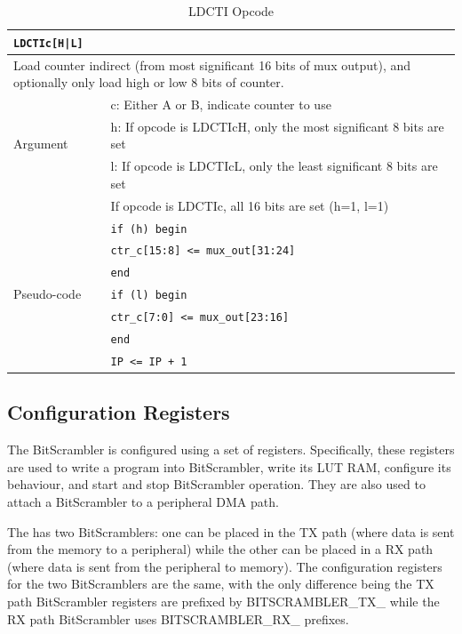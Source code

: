 \documentclass[main\_\_EN.tex]{subfiles}
\begin{document}
\begin{table}[H]
\caption{LDCTI Opcode}
\label{tab:bitscrm-ldcti-opcode}
\begin{tabular}{|l|l|}
\hline
\multicolumn{2}{|l|}{\texttt{LDCTIc[H|L]}} \\
\hline
\multicolumn{2}{|L{17cm}|}{Load counter indirect (from most significant 16 bits of mux output), and optionally only load high or low 8 bits of counter.} \\
\hline
\multirow{3}{*}{Argument} & c: Either A or B, indicate counter to use \\
& h: If opcode is LDCTIcH, only the most significant 8 bits are set\\
& l: If opcode is LDCTIcL, only the least significant 8 bits are set \\
& If opcode is LDCTIc, all 16 bits are set (h=1, l=1) \\
\hline
\multirow{7}{*}{Pseudo-code} & \texttt{if (h) begin} \\
& \hspace*{4mm} \texttt{ctr\_c[15:8] <= mux\_out[31:24]} \\
& \texttt{end} \\
& \texttt{if (l) begin} \\
& \hspace*{4mm} \texttt{ctr\_c[7:0] <= mux\_out[23:16]} \\
& \texttt{end} \\
& \texttt{IP <= IP + 1} \\
\hline
\end{tabular}
\end{table}


\subsection{Configuration Registers}

The BitScrambler is configured using a set of registers. Specifically, these registers are used to write a program into BitScrambler, write its LUT RAM, configure its behaviour, and start and stop BitScrambler operation. They are also used to attach a BitScrambler to a peripheral DMA path.

The \chipname{} has two BitScramblers: one can be placed in the TX path (where data is sent from the memory to a peripheral) while the other can be placed in a RX path (where data is sent from the peripheral to memory). The configuration registers for the two BitScramblers are the same, with the only difference being the TX path BitScrambler registers are prefixed by BITSCRAMBLER\_TX\_ while the RX path BitScrambler uses BITSCRAMBLER\_RX\_ prefixes.
\end{document}
